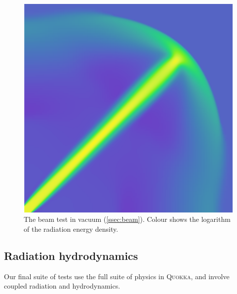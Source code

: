 \documentclass[fleqn,usenatbib]{mnras}
\newcommand{\quokka}{\textsc{Quokka}}
\begin{document}
\begin{figure}
    \includegraphics[width=\columnwidth]{beam2.png}
    \caption{The beam test in vacuum (\autoref{ssec:beam}). Colour shows the logarithm of the radiation energy density.}
    \label{fig:beam}
\end{figure}

\subsection{Radiation hydrodynamics}
\label{ssec:radhydro_tests}

Our final suite of tests use the full suite of physics in \quokka, and involve coupled radiation and hydrodynamics.
\end{document}
